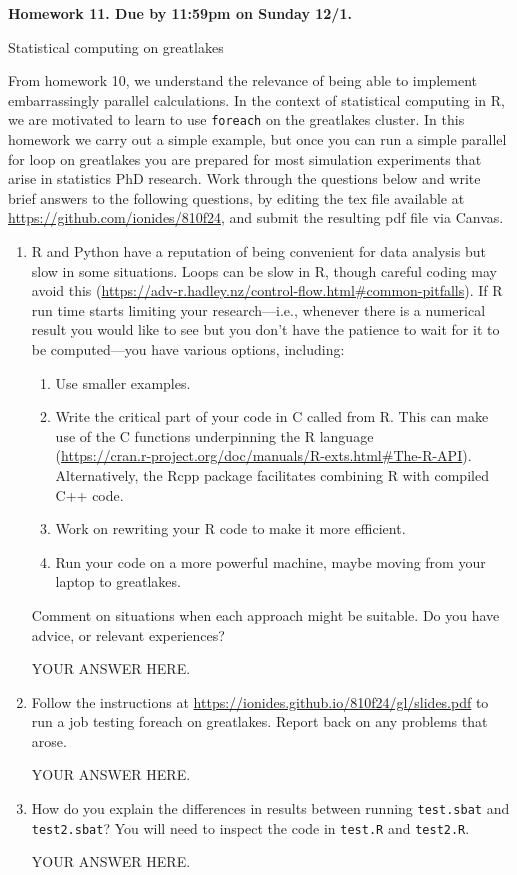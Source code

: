 \documentclass[12pt]{article}
\begin{document}
\begin{center}\bf
Homework 11. Due by 11:59pm on Sunday 12/1.

Statistical computing on greatlakes

\end{center}

From homework 10, we understand the relevance of being able to implement embarrassingly parallel calculations. In the context of statistical computing in R, we are motivated to learn to use \texttt{foreach} on the greatlakes cluster. In this homework we carry out a simple example, but once you can run a simple parallel for loop on greatlakes you are prepared for most simulation experiments that arise in statistics PhD research. Work through the questions below and write brief answers to the following questions, by editing the tex file available at \url{https://github.com/ionides/810f24}, and submit the resulting pdf file via Canvas. 

\begin{enumerate}

\item R and Python have a reputation of being convenient for data analysis but slow in some situations. Loops can be slow in R, though careful coding may avoid this (\url{https://adv-r.hadley.nz/control-flow.html#common-pitfalls}). If R run time starts limiting your research---i.e., whenever there is a numerical result you would like to see but you don't have the patience to wait for it to be computed---you have various options, including:
  \begin{enumerate}
  \item Use smaller examples.
  \item Write the critical part of your code in C called from R. This can make use of the C functions underpinning the R language\\
    (\url{https://cran.r-project.org/doc/manuals/R-exts.html#The-R-API}).
    \\
    Alternatively, the Rcpp package facilitates combining R with compiled C++ code.
  \item Work on rewriting your R code to make it more efficient.
  \item Run your code on a more powerful machine, maybe moving from your laptop to greatlakes.
  \end{enumerate}
Comment on situations when each approach might be suitable. Do you have advice, or relevant experiences?
  
YOUR ANSWER HERE.

\item Follow the instructions at \url{https://ionides.github.io/810f24/gl/slides.pdf} to run a job testing foreach on greatlakes. Report back on any problems that arose.

YOUR ANSWER HERE.

\item How do you explain the differences in results between running \texttt{test.sbat} and \texttt{test2.sbat}? You will need to inspect the code in \texttt{test.R} and \texttt{test2.R}.

YOUR ANSWER HERE.
  
\end{enumerate}
\end{document}
